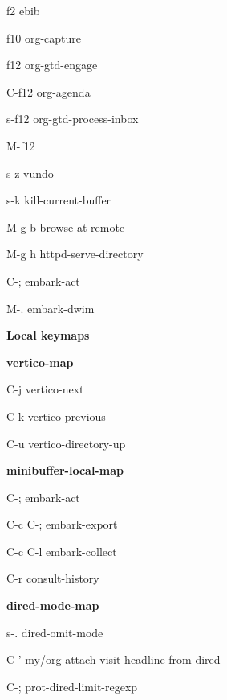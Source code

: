 \documentclass[10pt]{article}
\renewcommand\section[1]{\bigskip\par\textbf{\color{heading}\large#1}\smallskip}
\renewcommand\subsection[1]{\smallskip\par\textbf{\color{heading}#1}}
\begin{document}
\begin{multicols}{4}
\begin{keylist}
  \item[f2] ebib

  \item[f10] org-capture

  \item[f12] org-gtd-engage
  \item[C-f12] org-agenda
  \item[s-f12] org-gtd-process-inbox
  \item[M-f12]

  \item[s-z] vundo
  \item[s-k] kill-current-buffer

  \item[M-g b] browse-at-remote
  \item[M-g h] httpd-serve-directory
  \item[C-;] embark-act
  \item[M-.] embark-dwim
  \end{keylist}

  \section{Local keymaps}
  \subsection{vertico-map}
  \begin{keylist}
  \item[C-j] vertico-next
  \item[C-k] vertico-previous
  \item[C-u] vertico-directory-up
  \end{keylist}
  \subsection{minibuffer-local-map}
  \begin{keylist}
  \item[C-;] embark-act
  \item[C-c C-;] embark-export
  \item[C-c C-l] embark-collect

  \item[C-r] consult-history
  \end{keylist}

  \subsection{dired-mode-map}
  \begin{keylist}
  \item[s-.] dired-omit-mode
  \item[C-'] my/org-attach-visit-headline-from-dired
  \item[C-;] prot-dired-limit-regexp
  \end{keylist}

\end{multicols}
\end{document}
